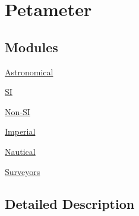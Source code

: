 \hypertarget{group___e_g_x_math-_conversions-_length_conversions-_s_i-_petameter}{}\section{Petameter}
\label{group___e_g_x_math-_conversions-_length_conversions-_s_i-_petameter}
\subsection*{Modules}
\begin{DoxyCompactItemize}
\item 
\mbox{\hyperlink{group___e_g_x_math-_conversions-_length_conversions-_s_i-_petameter-_astronomical}{Astronomical}}
\item 
\mbox{\hyperlink{group___e_g_x_math-_conversions-_length_conversions-_s_i-_petameter-_s_i}{SI}}
\item 
\mbox{\hyperlink{group___e_g_x_math-_conversions-_length_conversions-_s_i-_petameter-_non-_s_i}{Non-\/\+SI}}
\item 
\mbox{\hyperlink{group___e_g_x_math-_conversions-_length_conversions-_s_i-_petameter-_imperial}{Imperial}}
\item 
\mbox{\hyperlink{group___e_g_x_math-_conversions-_length_conversions-_s_i-_petameter-_nautical}{Nautical}}
\item 
\mbox{\hyperlink{group___e_g_x_math-_conversions-_length_conversions-_s_i-_petameter-_surveyors}{Surveyors}}
\end{DoxyCompactItemize}


\subsection{Detailed Description}
